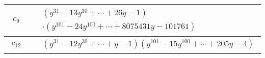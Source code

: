 \documentclass[1p]{elsarticle_modified}
\theoremstyle{definition}
\begin{document}
\begin{tabular}{m{50pt}|m{274pt}}
\hline $$\begin{aligned}c_{9}\end{aligned}$$&$\begin{aligned}
&(y^{31}-13 y^{30}+\cdots+26 y-1)\\
&\cdot(y^{101}-24 y^{100}+\cdots+8075431 y-101761)
\end{aligned}$\\
\hline $$\begin{aligned}c_{12}\end{aligned}$$&$\begin{aligned}
&(y^{31}-12 y^{30}+\cdots+y-1)(y^{101}-15 y^{100}+\cdots+205 y-4)
\end{aligned}$\\
\hline
\end{tabular}
\vskip 2pc
\end{document}
